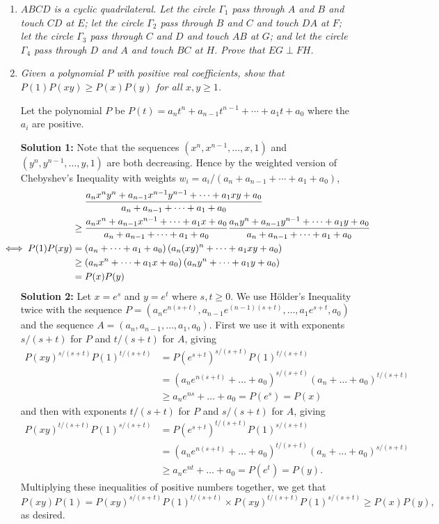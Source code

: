 \documentclass[a4paper,12pt]{article}
\begin{document}
\begin{enumerate}
	\item 
	\textit{$ABCD$ is a cyclic quadrilateral. Let the circle $\Gamma_1$ pass through $A$ and $B$ and touch $CD$ at $E$; let the circle $\Gamma_2$ pass through $B$ and $C$ and touch $DA$ at $F$; let the circle $\Gamma_3$ pass through $C$ and $D$ and touch $AB$ at $G$; and let the circle $\Gamma_4$ pass through $D$ and $A$ and touch $BC$ at $H$. Prove that $EG \perp FH$.}
	
	
	
	\item
	\textit{Given a polynomial $P$ with positive real coefficients, show that $P(1)P(xy) \geq P(x)P(y)$ for all $x,y \geq 1$.}
	
	Let the polynomial $P$ be $P(t) = a_n t^n +a_{n-1} t^{n-1} +\dotsb +a_1 t +a_0$ where the $a_i$ are positive.
	
	\textbf{Solution 1:} Note that the sequences $(x^n, x^{n-1}, \dotsc, x, 1)$ and $(y^n, y^{n-1}, \dotsc, y, 1)$ are both decreasing. Hence by the weighted version of Chebyshev's Inequality with weights $w_i = a_i/(a_n+a_{n-1}+\dotsb+a_1+a_0)$,
	\begin{align*}
		&\mspace{24mu} \frac{a_n x^ny^n +a_{n-1}x^{n-1}y^{n-1} +\dotsb +a_1 xy +a_0}{a_n+a_{n-1} +\dotsb +a_1 +a_0} \\ &\geq \frac{a_n x^n +a_{n-1}x^{n-1} +\dotsb +a_1 x +a_0}{a_n+a_{n-1} +\dotsb +a_1 +a_0} \frac{a_n y^n +a_{n-1}y^{n-1} +\dotsb +a_1 y +a_0}{a_n+a_{n-1} +\dotsb +a_1 +a_0} \\
		\mspace{-36mu} \iff P(1)P(xy) &= \left(a_n +\dotsb +a_1 +a_0\right) \left(a_n(xy)^n +\dotsb +a_1 xy +a_0\right) \\ &\geq \left(a_nx^n +\dotsb +a_1 x +a_0\right) \left(a_ny^n +\dotsb +a_1 y +a_0\right) \\ &= P(x)P(y)
	\end{align*}
	\textbf{Solution 2:} Let $x = e^s$ and $y = e^t$ where $s,t \geq 0$. We use H\"older's Inequality twice with the sequence $P = (a_n e^{n(s+t)}, a_{n-1} e^{(n-1)(s+t)}, \dotsc, a_1 e^{s+t}, a_0)$ and the sequence $A = (a_n, a_{n-1}, \dotsc, a_1, a_0)$. First we use it with exponents $s/(s+t)$ for $P$ and $t/(s+t)$ for $A$, giving \begin{align*} P(xy)^{s/(s+t)} P(1)^{t/(s+t)} &= P\!\left(e^{s+t}\right)^{s/(s+t)} P(1)^{t/(s+t)} \\ &= \left(a_n e^{n(s+t)} +\dotsc +a_0\right)^{s/(s+t)} \left(a_n +\dotsc +a_0\right)^{t/(s+t)} \\ &\geq a_n e^{ns} +\dotsc +a_0 = P(e^s) = P(x)\end{align*} and then with exponents $t/(s+t)$ for $P$ and $s/(s+t)$ for $A$, giving \begin{align*} P(xy)^{t/(s+t)} P(1)^{s/(s+t)} &= P\!\left(e^{s+t}\right)^{t/(s+t)} P(1)^{s/(s+t)} \\ &= \left(a_n e^{n(s+t)} +\dotsc +a_0\right)^{t/(s+t)} \left(a_n +\dotsc +a_0\right)^{s/(s+t)} \\ &\geq a_n e^{nt} +\dotsc +a_0 = P(e^t) = P(y).\end{align*}
	Multiplying these inequalities of positive numbers together, we get that \[P(xy)P(1) = P(xy)^{s/(s+t)} P(1)^{t/(s+t)} \times P(xy)^{t/(s+t)} P(1)^{s/(s+t)} \geq P(x) P(y),\] as desired.

\end{enumerate}
\end{document}
